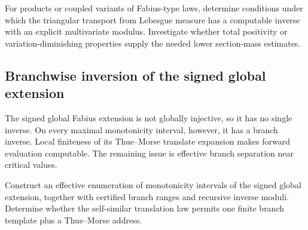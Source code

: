 \begin{problem}
\label{comp:prob:atomic-transport}
For products or coupled variants of Fabius-type laws, determine conditions
under which the triangular transport from Lebesgue measure has a computable
inverse with an explicit multivariate modulus.  Investigate whether total
positivity or variation-diminishing properties supply the needed lower
section-mass estimates.
\end{problem}

\subsection{Branchwise inversion of the signed global extension}

The signed global Fabius extension is not globally injective, so it has no
single inverse.  On every maximal monotonicity interval, however, it has a
branch inverse.  Local finiteness of its Thue--Morse translate expansion makes
forward evaluation computable.  The remaining issue is effective branch
separation near critical values.

\begin{problem}
\label{comp:prob:branch-atlas}
Construct an effective enumeration of monotonicity intervals of the signed
global extension, together with certified branch ranges and recursive inverse
moduli.  Determine whether the self-similar translation law permits one finite
branch template plus a Thue--Morse address.
\end{problem}
